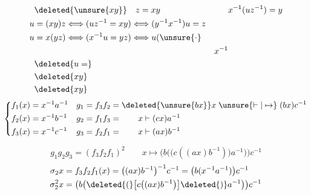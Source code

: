 \[
\begin{aligned}
&\deleted{\unsure{xy}}\quad z=xy && x^{-1}(uz^{-1})=y\\
u&=(xy)z\Longleftrightarrow(uz^{-1}=xy)\Longleftrightarrow (y^{-1}x^{-1})u=z\\
u&=x(yz)\Longleftrightarrow(x^{-1}u=yz)\Longleftrightarrow u(\unsure{\cdot}\\
&&x^{-1}\\
&\deleted{u=}\\
&\deleted{xy}\\
&\deleted{xy}
\end{aligned}
\]
\[
\left\{\begin{aligned}
f_1(x)&=x^{-1}a^{-1}&g_1&=f_3f_2=\deleted{\unsure{bx}}x\mathrel{\unsure{\vdash|\mapsto}}(bx)c^{-1}\\
f_2(x)&=x^{-1}b^{-1}&g_2&=f_1f_3=\qquad x\mathrel{\vdash}(cx)a^{-1}\\
f_3(x)&=x^{-1}c^{-1}&g_3&=f_2f_1=\qquad x\mathrel{\vdash}(ax)b^{-1}
\end{aligned}\right.
\]

\[
g_1g_2g_3=(f_3f_2f_1)^2\qquad x\mapsto\bigl(b\bigl(\bigl(c((ax)b^{-1})\bigr)a^{-1}\bigr)\bigr)c^{-1}
\]
\[
\begin{aligned}
\sigma_2x&=f_3f_2f_1(x)=\bigl((ax)b^{-1}\bigr)^{-1}c^{-1}
=\bigl(b(x^{-1}a^{-1})\bigr)c^{-1}\\
\sigma_2^2x&=\bigl(b\bigl(\deleted{(}\bigl[c\bigl((ax)b^{-1}\bigr)\bigr]\deleted{)}a^{-1}\bigr)\bigr)c^{-1}
\end{aligned}
\]

